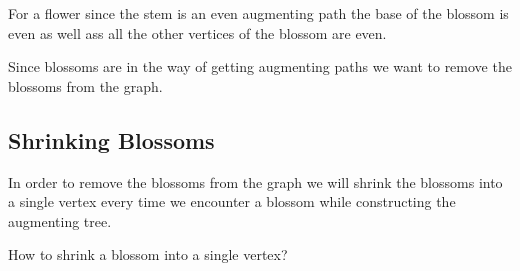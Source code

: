 \begin{observation}
	For a flower since the stem is an even augmenting path the base of the blossom is even as well ass all the other vertices of the blossom are even.
\end{observation}

Since blossoms are in the way of getting augmenting paths we want to remove the blossoms from the graph.
\subsection{Shrinking Blossoms}
In order to remove the blossoms from the graph we will shrink the blossoms into a single vertex every time we encounter a blossom while constructing the augmenting tree.
\begin{question}{}{}
	How to shrink a blossom into a single vertex?
\end{question}

